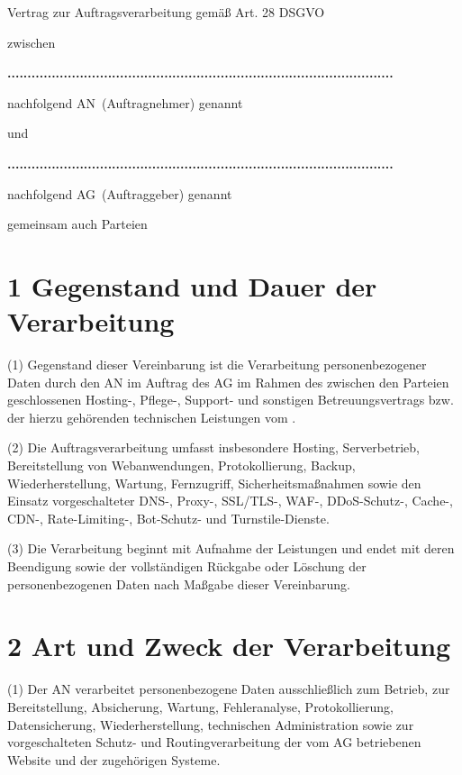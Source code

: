 \documentclass[11pt,a4paper]{article}
\newcommand{\fillline}{\makebox[4.5cm]{\dotfill}}
\begin{document}
\thispagestyle{empty}

\begin{center}
{\LARGE Vertrag zur Auftragsverarbeitung gemäß Art. 28 DSGVO\par}
\end{center}

\vspace{1em}

zwischen\par
\vspace{1.5em}
\textbf{................................................................................................}\par
\vspace{1em}
nachfolgend \glqq AN\grqq\ (Auftragnehmer) genannt\par
\vspace{1em}
und\par
\vspace{1em}
\textbf{................................................................................................}\par
\vspace{1em}
nachfolgend \glqq AG\grqq\ (Auftraggeber) genannt\par
\vspace{1em}
gemeinsam auch \glqq Parteien\grqq

\section*{1 Gegenstand und Dauer der Verarbeitung}
(1) Gegenstand dieser Vereinbarung ist die Verarbeitung personenbezogener Daten durch den AN im Auftrag des AG im Rahmen des zwischen den Parteien geschlossenen Hosting-, Pflege-, Support- und sonstigen Betreuungsvertrags bzw. der hierzu gehörenden technischen Leistungen vom \fillline .

(2) Die Auftragsverarbeitung umfasst insbesondere Hosting, Serverbetrieb, Bereitstellung von Webanwendungen, Protokollierung, Backup, Wiederherstellung, Wartung, Fernzugriff, Sicherheitsmaßnahmen sowie den Einsatz vorgeschalteter DNS-, Proxy-, SSL/TLS-, WAF-, DDoS-Schutz-, Cache-, CDN-, Rate-Limiting-, Bot-Schutz- und Turnstile-Dienste.

(3) Die Verarbeitung beginnt mit Aufnahme der Leistungen und endet mit deren Beendigung sowie der vollständigen Rückgabe oder Löschung der personenbezogenen Daten nach Maßgabe dieser Vereinbarung.

\section*{2 Art und Zweck der Verarbeitung}
(1) Der AN verarbeitet personenbezogene Daten ausschließlich zum Betrieb, zur Bereitstellung, Absicherung, Wartung, Fehleranalyse, Protokollierung, Datensicherung, Wiederherstellung, technischen Administration sowie zur vorgeschalteten Schutz- und Routingverarbeitung der vom AG betriebenen Website und der zugehörigen Systeme.
\end{document}
